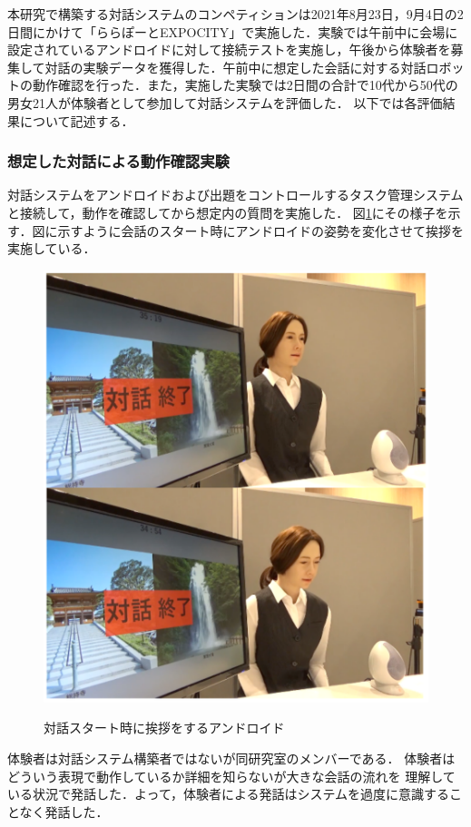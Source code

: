 本研究で構築する対話システムのコンペティションは2021年8月23日，9月4日の2日間にかけて「ららぽーとEXPOCITY」で実施した．実験では午前中に会場に設定されているアンドロイドに対して接続テストを実施し，午後から体験者を募集して対話の実験データを獲得した．午前中に想定した会話に対する対話ロボットの動作確認を行った．また，実施した実験では2日間の合計で10代から50代の男女21人が体験者として参加して対話システムを評価した．
以下では各評価結果について記述する．

\subsubsection{想定した対話による動作確認実験}
対話システムをアンドロイドおよび出題をコントロールするタスク管理システムと接続して，動作を確認してから想定内の質問を実施した．
図\ref{fig:android1}にその様子を示す．図に示すように会話のスタート時にアンドロイドの姿勢を変化させて挨拶を実施している．
%
\begin{figure}[h]
        \centering
        \includegraphics[scale=0.4]{pic/android1.pdf}
        \label{fig:android1}
        \caption{対話スタート時に挨拶をするアンドロイド}
\end{figure}
体験者は対話システム構築者ではないが同研究室のメンバーである．
体験者はどういう表現で動作しているか詳細を知らないが大きな会話の流れを
理解している状況で発話した．よって，体験者による発話はシステムを過度に意識することなく発話した．

